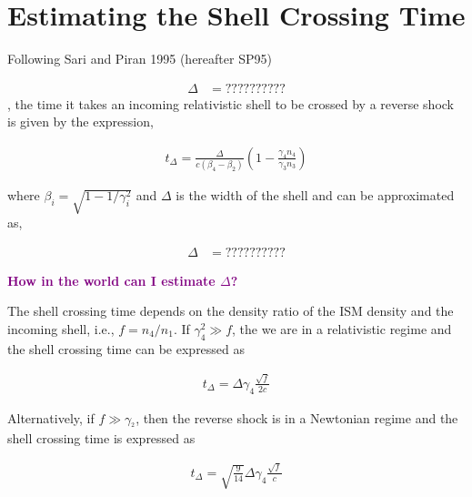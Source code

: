 \documentclass[linenumbers,twocolumn]{aastex631}
\newcommand{\mm}[1]{{\textcolor{purple}{\bf #1}}}
\begin{document}
\section{Estimating the Shell Crossing Time}
{
    Following Sari and Piran 1995 (hereafter SP95)    

    \begin{align}
        \Delta &= ??????????
    \end{align}, the time it takes an incoming relativistic shell to be crossed by a reverse shock is given by the expression, 

    \begin{align}
        t_{\Delta} = \frac{\Delta}{c(\beta_4 - \beta_2)} \left(1-\frac{\gamma_4 n_4}{\gamma_3 n_3}\right)
    \end{align} 

    where $\beta_i = \sqrt{1 - 1/\gamma_i^2}$ and $\Delta$ is the width of the shell and can be approximated as, 

    \begin{align}
        \Delta &= ??????????
    \end{align}

    \mm{How in the world can I estimate $\Delta$?}

    The shell crossing time depends on the density ratio of the ISM density and the incoming shell, i.e., $f = n_4/n_1$. If $\gamma_4^2 \gg f$, the we are in a relativistic regime and the shell crossing time can be expressed as 

    \begin{align}
        t_{\Delta} = \Delta \gamma_4 \frac{\sqrt{f}}{2c}
    \end{align}

    Alternatively, if $f\gg\gamma_^2$, then the reverse shock is in a Newtonian regime and the shell crossing time is expressed as

    \begin{align}
        t_{\Delta} = \sqrt{\frac{9}{14}}\Delta\gamma_4\frac{\sqrt{f}}{c}
    \end{align}

}
\end{document}
